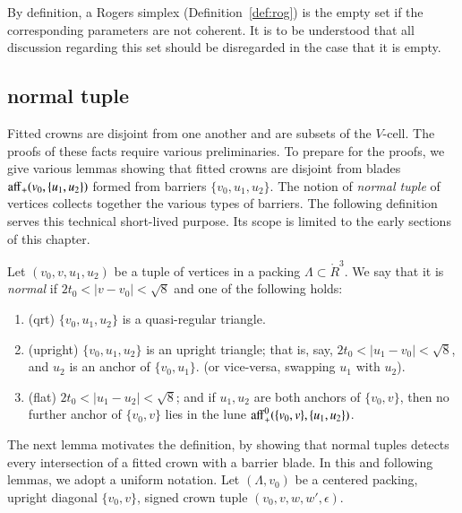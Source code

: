 By definition, a Rogers simplex (Definition~\ref{def:rog}) is  the
empty set 
if the corresponding parameters are not coherent.  It is to
be understood that all discussion regarding this set
should be disregarded in the case that it is empty.



\subsection{normal tuple}


Fitted crowns are disjoint from one another and are
subsets of the $V$-cell.  The proofs of these facts 
require various preliminaries.  To prepare for the proofs,
we give various lemmas showing that fitted crowns are
disjoint from blades ${\operatorname{aff}}_+(v_0,\{u_1,u_2\})$ formed from
barriers $\{v_0,u_1,u_2\}$.  The notion of {\it normal tuple} of vertices
collects together the various types of barriers.  
The following definition serves this technical short-lived purpose.  Its scope
is limited to the early sections of this chapter.


\begin{definition}[normal]  Let $(v_0,v,u_1,u_2)$ be a tuple of vertices
in a packing $\Lambda\subset\ring{R}^3$.  We say that it is {\it normal} if $2t_0<|v-v_0|<\sqrt8$
and one of the
following holds:
\begin{enumerate}
  \item (qrt) $\{v_0,u_1,u_2\}$ is a quasi-regular triangle.
  \item (upright) $\{v_0,u_1,u_2\}$ is an upright triangle; that is, say,
    $2t_0 < |u_1-v_0| < \sqrt8$, and $u_2$ is an anchor of $\{v_0,u_1\}$.
    (or vice-versa, swapping $u_1$ with $u_2$).
  \item (flat)
   $2t_0<|u_1-u_2|<\sqrt8$; and if $u_1,u_2$ are both anchors of
   $\{v_0,v\}$, 
   then
    no further anchor of $\{v_0,v\}$
   lies in the lune ${\operatorname{aff}}^0_+(\{v_0,v\},\{u_1,u_2\})$.
\end{enumerate}
\end{definition}



The next lemma motivates the
definition, by showing that normal tuples detects every intersection
of a fitted crown with a barrier blade.
In this and following lemmas, we adopt a uniform notation.  Let $(\Lambda,v_0)$ be a centered packing, upright diagonal 
$\{v_0,v\}$, signed crown tuple
$(v_0,v,w,w',\epsilon)$.

